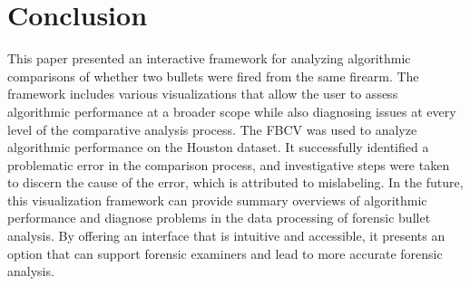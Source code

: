 \documentclass[
  number,
  preprint,
  5p,
  twocolumn]{elsarticle}
\begin{document}
\section{Conclusion}\label{conclusion}

This paper presented an interactive framework for analyzing algorithmic
comparisons of whether two bullets were fired from the same firearm. The
framework includes various visualizations that allow the user to assess
algorithmic performance at a broader scope while also diagnosing issues
at every level of the comparative analysis process. The FBCV was used to
analyze algorithmic performance on the Houston dataset. It successfully
identified a problematic error in the comparison process, and
investigative steps were taken to discern the cause of the error, which
is attributed to mislabeling. In the future, this visualization
framework can provide summary overviews of algorithmic performance and
diagnose problems in the data processing of forensic bullet analysis. By
offering an interface that is intuitive and accessible, it presents an
option that can support forensic examiners and lead to more accurate
forensic analysis.


  
\end{document}
